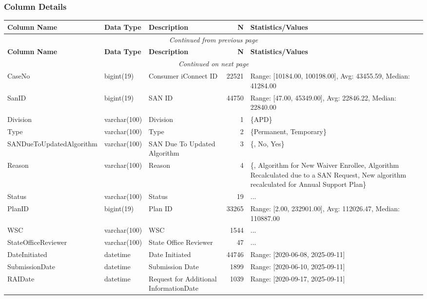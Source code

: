 \begin{landscape}
\subsubsection{Column Details}
\begin{longtable}{|l|l|l|r|p{6cm}|}
\hline
\textbf{Column Name} & \textbf{Data Type} & \textbf{Description} & \textbf{N} & \textbf{Statistics/Values} \\
\hline
\endfirsthead
\multicolumn{5}{c}{\textit{Continued from previous page}} \\
\hline
\textbf{Column Name} & \textbf{Data Type} & \textbf{Description} & \textbf{N} & \textbf{Statistics/Values} \\
\hline
\endhead
\hline
\multicolumn{5}{c}{\textit{Continued on next page}} \\
\endfoot
\hline
\endlastfoot
CaseNo & bigint(19) & Consumer iConnect ID & 22521 & Range: [10184.00, 100198.00], Avg: 43455.59, Median: 41284.00 \\
\hline
SanID & bigint(19) & SAN ID & 44750 & Range: [47.00, 45349.00], Avg: 22846.22, Median: 22840.00 \\
\hline
Division & varchar(100) & Division & 1 & \{APD\} \\
\hline
Type & varchar(100) & Type & 2 & \{Permanent, Temporary\} \\
\hline
SANDueToUpdatedAlgorithm & varchar(100) & SAN Due To Updated Algorithm & 3 & \{, No, Yes\} \\
\hline
Reason & varchar(100) & Reason & 4 & \{, Algorithm for New Waiver Enrollee, Algorithm Recalculated due to a SAN Request, New algorithm recalculated for Annual Support Plan\} \\
\hline
Status & varchar(100) & Status & 19 & ... \\
\hline
PlanID & bigint(19) & Plan ID & 33265 & Range: [2.00, 232901.00], Avg: 112026.47, Median: 110887.00 \\
\hline
WSC & varchar(100) & WSC & 1544 & ... \\
\hline
StateOfficeReviewer & varchar(100) & State Office Reviewer & 47 & ... \\
\hline
DateInitiated & datetime & Date Initiated & 44746 & Range: [2020-06-08, 2025-09-11] \\
\hline
SubmissionDate & datetime & Submission Date & 1899 & Range: [2020-06-10, 2025-09-11] \\
\hline
RAIDate & datetime & Request for Additional InformationDate & 1039 & Range: [2020-09-17, 2025-09-11] \\
\hline

\end{longtable}
\end{landscape}
